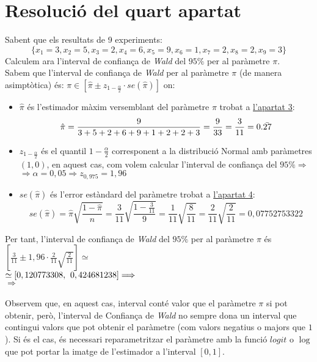 \documentclass[12pt]{article}
\begin{document}
\section{Resolució del quart apartat}
Sabent que els resultats de 9 experiments: $$\{ x_1 = 3, x_2 = 5, x_3 = 2, x_4 = 6, x_5 = 9, x_6 = 1, x_7 = 2, x_8 = 2, x_9 = 3\}$$
Calculem ara l'interval de confiança de \textit{Wald} del $95\%$ per al paràmetre $\pi$.\\
Sabem que l'interval de confiança de \textit{Wald} per al paràmetre $\pi$ (de manera asimptòtica) és: $\pi\in\left[ \hat{\pi} \pm z_{1-\frac{\alpha}{2}} \cdot se(\hat{\pi}) \right]$ on:
\begin{itemize}
\item $\hat{\pi}$ és l'estimador màxim versemblant del paràmetre $\pi$ trobat a \href{estimador}{\textcolor{blue(ncs)}{l'apartat 3}}:
$$\hat{\pi} = \frac{9}{3+5+2+6+9+1+2+2+3} = \frac{9}{33}=\frac{3}{11} = 0.\Bar{27}$$
\item $ z_{1-\frac{\alpha}{2}} $ és el quantil $1-\frac{\alpha}{2}$ corresponent a la distribució Normal amb paràmetres $(1,0)$, en aquest cas, com volem calcular l'interval de confiança del $95\% \Rightarrow$ \\$ \Rightarrow \alpha=0,05 \Rightarrow z_{0,975} = 1,96$
\item $se(\hat{\pi})$ és l'error estàndard del paràmetre trobat a \href{se}{\textcolor{blue(ncs)}{l'apartat 4}}:
$$se(\hat{\pi})=\hat{\pi}\sqrt{\frac{1-\hat{\pi}}{n}} = \frac{3}{11}\sqrt{\frac{1-\frac{3}{11}}{9}} = \frac{1}{11}\sqrt{\frac{8}{11}} = \frac{2}{11}\sqrt{\frac{2}{11}} = 0,07752753322 $$
\end{itemize}
Per tant, l'interval de confiança de \textit{Wald} del $95\%$ per al paràmetre $\pi$ és $\left[ \frac{3}{11} \pm 1,96 \cdot \frac{2}{11}\sqrt{\frac{2}{11}} \right]\simeq$\\ $ \simeq \left[ 0,120773308, \hspace{0.4em} 0,424681238 \right] \Longrightarrow$\\
$\Longrightarrow$\\\\
Observem que, en aquest cas, interval conté valor que el paràmetre $\pi$ si pot obtenir, però, l'interval de Confiança de \textit{Wald} no sempre dona un interval que contingui valors que pot obtenir el paràmetre (com valors negatius o majors que $1$). Si és el cas, és necessari reparametritzar el paràmetre amb la funció $logit$ o $\log$ que pot portar la imatge de l'estimador a l'interval $[0,1]$.
\newpage
\end{document}
